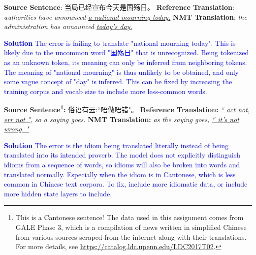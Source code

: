 \begin{parts}
\begin{subparts}
        \subpart[2]
        \textbf{Source Sentence}: 当局已经宣布今天是国殇日。 \newline
        \textbf{Reference Translation}: \textit{authorities have announced \underline{a national mourning today.}}\newline
        \textbf{NMT Translation}: \textit{the administration has announced \underline{today's day.}}

        \textcolor{blue}{
            \textbf{Solution} The error is failing to translate "national mourning today". This is likely due to the uncommon word "国殇日" that is unrecognized. Being tokenized as an unknown token, its meaning can only be inferred from neighboring tokens. The meaning of "national mourning" is thus unlikely to be obtained, and only some vague concept of "day" is inferred. This can be fixed by increasing the training corpus and vocab size to include more less-common words.
        }
        
        
        \subpart[2] 
        \textbf{Source Sentence\footnote{This is a Cantonese sentence! The data used in this assignment comes from GALE Phase 3, which is a compilation of news written in simplified Chinese from various sources scraped from the internet along with their translations. For more details, see \url{https://catalog.ldc.upenn.edu/LDC2017T02}. }:} 俗语有云:``唔做唔错"。\newline
        \textbf{Reference Translation:} \textit{\underline{`` act not, err not "}, so a saying goes.}\newline
        \textbf{NMT Translation:} \textit{as the saying goes, \underline{`` it's not wrong. "}}

        \textcolor{blue}{
            \textbf{Solution} The error is the idiom being translated literally instead of being translated into its intended proverb. The model does not explicitly distinguish idioms from a sequence of words, so idioms will also be broken into words and translated normally. Especially when the idiom is in Cantonese, which is less common in Chinese text corpora. To fix, include more idiomatic data, or include more hidden state layers to include.
        }
        
        
    \end{subparts}



\end{parts}
